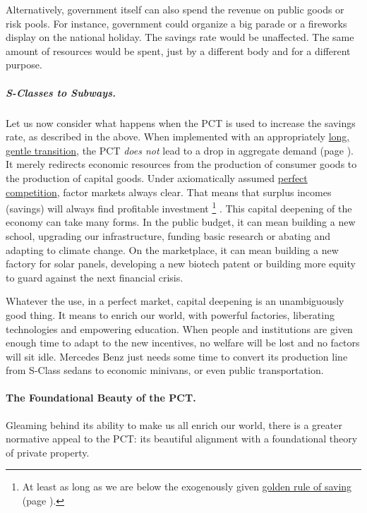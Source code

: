 Alternatively, government itself can also spend the revenue on public goods or risk pools.
For instance, government could organize a big parade or a fireworks display on the national holiday.
The savings rate would be unaffected.
The same amount of resources would be spent, just by a different body and for a different purpose.

\subparagraph{S-Classes to Subways.} Let us now consider what happens when the PCT is used to increase the savings rate, as described in the above.
When implemented with an appropriately \hyperref[sec:GoSlow]{long, gentle transition}, the PCT \emph{does not} lead to a drop in aggregate demand (page \pageref{sec:GoSlow}).
It merely redirects economic resources from the production of consumer goods to the production of capital goods.
Under axiomatically assumed \hyperref[sec:PerfectCompetition]{perfect competition}, factor markets always clear.
That means that surplus incomes (savings) will always find profitable investment
\footnote{
	At least as long as we are below the exogenously given \hyperref[eq:GoldenRuleSavings]{golden rule of saving} (page \pageref{eq:GoldenRuleSavings}).
}
.
This capital deepening of the economy can take many forms.
In the public budget, it can mean building a new school, upgrading our infrastructure, funding basic research or abating and adapting to climate change.
On the marketplace, it can mean building a new factory for solar panels, developing a new biotech patent or building more equity to guard against the next financial crisis.

Whatever the use, in a perfect market, capital deepening is an unambiguously good thing.
It means to enrich our world, with powerful
factories, liberating technologies and empowering education.
When people and institutions are given enough time to adapt to the new incentives, no welfare will be lost and no factors will sit idle.
Mercedes Benz just needs some time to convert its production line from S-Class sedans to economic minivans, or even public transportation.


\paragraph{The Foundational Beauty of the PCT.}  \label{sec:FoundationalBeauty} Gleaming behind its ability to make us all enrich our world, there is a greater normative appeal to the PCT:
its beautiful alignment with a foundational theory of private property.

